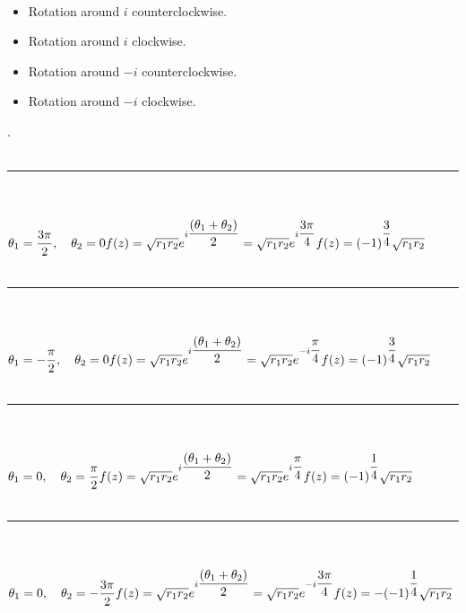 \documentclass[fleqn]{article}
\begin{document}
{      \\
      \begin{itemize}
        \item Rotation around $i$ counterclockwise. 
        \item Rotation around $i$ clockwise.
        \item Rotation around $-i$ counterclockwise. 
        \item Rotation around $-i$ clockwise.
      \end{itemize}.
      \\
      \\
      \rule{15cm}{1pt}
      \\
      \\
      $
        \theta_1=\dfrac{3 \pi}{2}, ~~~ \theta_2=0 \\
        \\
        \\
        f(z)=\sqrt{r_1 r_2} e^{i\dfrac{(\theta_1+\theta_2)}{2}}=\sqrt{r_1 r_2} e^{i\dfrac{3 \pi}{4}} \\
        \\
        f(z)=(-1)^{\dfrac{3}{4}} \sqrt{r_1 r_2}
      $
      \\
      \\
      \rule{15cm}{1pt}
      \\
      \\
      $
        \theta_1=-\dfrac{\pi}{2}, ~~~ \theta_2=0 \\
        \\
        \\
        f(z)=\sqrt{r_1 r_2} e^{i\dfrac{(\theta_1+\theta_2)}{2}}=\sqrt{r_1 r_2} e^{-i\dfrac{\pi}{4}} \\
        \\
        f(z)=(-1)^{\dfrac{3}{4}} \sqrt{r_1 r_2}
      $
      \\
      \\
      \rule{15cm}{1pt}
      \\
      \\
      $
        \theta_1=0, ~~~ \theta_2=\dfrac{\pi}{2} \\
        \\
        \\
        f(z)=\sqrt{r_1 r_2} e^{i\dfrac{(\theta_1+\theta_2)}{2}}=\sqrt{r_1 r_2} e^{i\dfrac{\pi}{4}} \\
        \\
        f(z)=(-1)^{\dfrac{1}{4}} \sqrt{r_1 r_2}
      $
      \\
      \\
      \rule{15cm}{1pt}
      \\
      \\
      $
        \theta_1=0, ~~~ \theta_2=-\dfrac{3\pi}{2} \\
        \\
        \\
        f(z)=\sqrt{r_1 r_2} e^{i\dfrac{(\theta_1+\theta_2)}{2}}=\sqrt{r_1 r_2} e^{-i\dfrac{3\pi}{4}} \\
        \\
        f(z)=-(-1)^{\dfrac{1}{4}} \sqrt{r_1 r_2}
      $
    }
\end{document}
